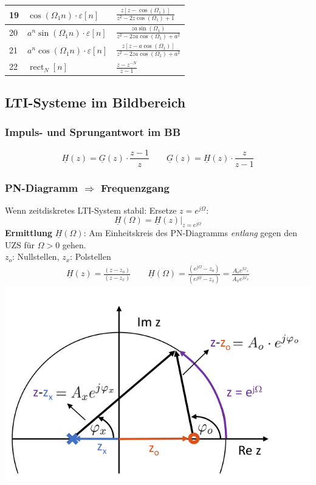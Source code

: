 \begin{multicols*}{2}
\begin{tabularx}{\columnwidth}{|l|X|X|}
\hline \textbf{19} & $\cos (\Omega_1 n ) \cdot \varepsilon[n]$ & $\frac{z[z-\cos (\Omega_1)]}{z^{2}-2 z \cos (\Omega_1)+1}$ \\
\hline 20 & $a^{n} \sin (\Omega_1 n) \cdot \varepsilon[n]$ & $\frac{z a \sin (\Omega_1)}{z^{2}-2 z a \cos (\Omega_1)+a^{2}}$ \\
\hline 21 & $a^{n} \cos (\Omega_1 n) \cdot \varepsilon[n]$ & $\frac{z[z-a \cos (\Omega_1)]}{z^{2}-2 z a \cos (\Omega_1)+a^{2}}$ \\
\hline 22 & $\operatorname{rect}_{N}[n]$ & $\frac{z-z^{-N}}{z-1}$ \\
\hline
\end{tabularx}
\clearpage

\subsection{LTI-Systeme im Bildbereich}
\subsubsection{Impuls- und Sprungantwort im BB}
$$
	\boxed{\underline{H}(z) = \underline{G}(z) \cdot \frac{z-1}{z} } \qquad \boxed{
	\underline{G}(z) = \underline{H}(z) \cdot \frac{z}{z-1} }
$$




\subsubsection{PN-Diagramm $\Rightarrow$ Frequenzgang}
Wenn zeitdiskretes LTI-System stabil: Ersetze $z=e^{j\Omega}$:\\
\[ \boxed{
	\underline{H}(\Omega)=\left.\underline{H}(z)\right|_{z=e^{j \Omega}} }
\]
\textbf{Ermittlung} $\underline{H}(\Omega)$: Am Einheitskreis des PN-Diagramms \textit{entlang} gegen den UZS für $\Omega > 0$ gehen.\\

$z_o$: Nullstellen, \quad $z_x$: Polstellen
\begin{gather*}
	\underline{H}(z)=\frac{\left(z-z_{o}\right)}{\left(z-z_{x}\right)} \qquad
	\underline{H}(\Omega)=\frac{\left(e^{j \Omega}-z_{o}\right)}{\left(e^{j \Omega}-z_{x}\right)}=\frac{A_{o} e^{j \varphi_{o}}}{A_{x} e^{j \varphi_{x}}}
\end{gather*}
\centering
\includegraphics[width=0.7\columnwidth]{Bilder/PN-FreqGang}


\end{multicols*}
